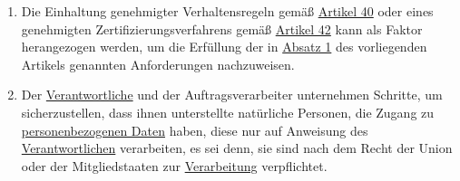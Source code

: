 \begin{enumerate}
  \item Die Einhaltung genehmigter Verhaltensregeln gemäß \hyperref[ch:40]{Artikel 40} oder eines genehmigten
   Zertifizierungsverfahrens gemäß \hyperref[ch:42]{Artikel 42} kann als Faktor herangezogen werden, um die Erfüllung
   der in \hyperref[itm:32-1]{Absatz 1} des vorliegenden Artikels genannten Anforderungen nachzuweisen.
  \label{itm:32-3}

  \item Der \hyperref[itm:04-7]{Verantwortliche} und der Auftragsverarbeiter unternehmen Schritte, um sicherzustellen, dass ihnen
   unterstellte natürliche Personen, die Zugang zu \hyperref[itm:04-1]{personenbezogenen Daten} haben, diese nur auf Anweisung des
   \hyperref[itm:04-7]{Verantwortlichen} verarbeiten, es sei denn, sie sind nach dem Recht der Union oder der Mitgliedstaaten zur
   \hyperref[itm:04-2]{Verarbeitung} verpflichtet.
  \label{itm:32-4}

\end{enumerate}


